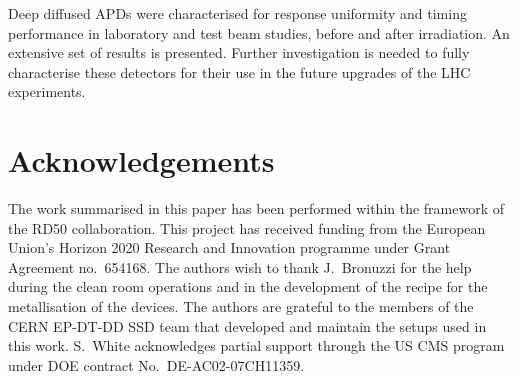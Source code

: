 \documentclass[3p,preprint,twocolumn]{elsarticle}
\begin{document}
Deep diffused APDs were characterised for response uniformity and timing performance in laboratory and test beam studies, before and after irradiation.
An extensive set of results is presented.
Further investigation is needed to fully characterise these detectors for their use in the future upgrades of the LHC experiments.

\section*{Acknowledgements}

The work summarised in this paper has been performed within the framework of the RD50 collaboration.
This project has received funding from the European Union’s Horizon 2020 Research and Innovation programme under Grant Agreement no.\ 654168.
The authors wish to thank J.~Bronuzzi for the help during the clean room operations and in the development of the recipe for the metallisation of the devices.
The authors are grateful to the members of the CERN EP-DT-DD SSD team that developed and maintain the setups used in this work.
S.\ White acknowledges partial support through the US CMS program under DOE contract No.\ DE-AC02-07CH11359.

%
%

\end{document}
